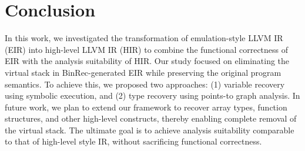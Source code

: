 \section{Conclusion}
In this work, we investigated the transformation of emulation-style LLVM IR
(EIR) into high-level LLVM IR (HIR) to combine the functional correctness of
EIR with the analysis suitability of HIR. Our study focused on eliminating the
virtual stack in BinRec-generated EIR while preserving the original program
semantics. To achieve this, we proposed two approaches: (1) variable recovery
using symbolic execution, and (2) type recovery using points-to graph analysis.
In future work, we plan to extend our framework to recover array types,
function structures, and other high-level constructs, thereby enabling complete
removal of the virtual stack. The ultimate goal is to achieve analysis
suitability comparable to that of high-level style IR, without sacrificing
functional correctness.
